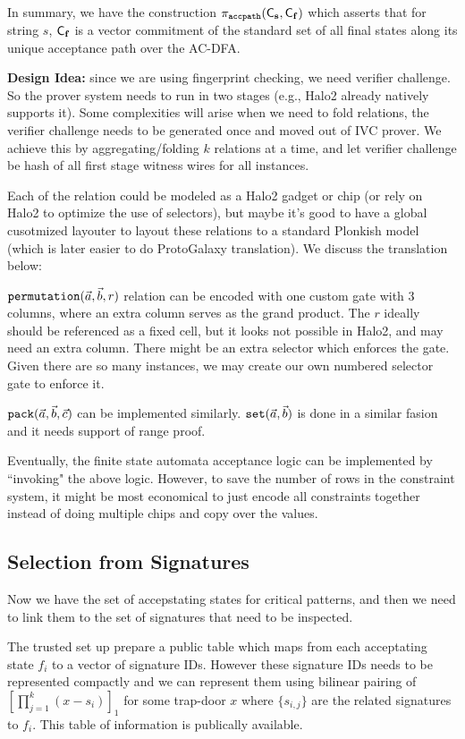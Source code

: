 In summary, we have the construction
$\pi_{\texttt{accpath}}({\mathsf{C}}_{{{\mathbf {s}}}}, {\mathsf{C}}_{{{\mathbf {f}}}})$ which
asserts that for string $s$, ${\mathsf{C}}_{{{\mathbf {f}}}}$
is a vector commitment of the standard set of all
final states along its unique acceptance path over the 
AC-DFA.

{\bf Design Idea:} since we are using fingerprint checking, we
need verifier challenge. So the prover system needs to run 
in two stages (e.g., Halo2 already natively supports it).
Some complexities will arise when we need to fold relations,
the verifier challenge needs to be generated once and moved out
of IVC prover. We achieve this by aggregating/folding $k$
relations at a time, and let verifier challenge be
hash of all first stage witness wires for all instances.

Each of the relation could be modeled as a Halo2 gadget or chip
(or rely on Halo2 to optimize the use of selectors), but 
maybe it's good to have a global cusotmized layouter to
layout these relations to a standard Plonkish model (which
is later easier to do ProtoGalaxy translation). We discuss the
translation below:

${\tt permutation}(\vec{a}, \vec{b}, r)$ relation can be encoded
with one custom gate with $3$ columns, where an extra column
serves as the grand product. The $r$ ideally should be referenced
as a fixed cell, but it looks not possible in Halo2, and may need
an extra column. There might be an extra selector which enforces
the gate. Given there are so many instances, we may create our
own numbered selector gate to enforce it.

${\tt pack}(\vec{a}, \vec{b}, \vec{c})$ can be implemented similarly.
${\tt set}(\vec{a},\vec{b})$ is done in a similar fasion and
it needs support of range proof.

Eventually, the finite state automata acceptance logic
can be implemented by ``invoking" the above logic. However,
to save the number of rows in the constraint system, it might
be most economical to just encode all constraints together
instead of doing multiple chips and copy over the values.

\subsection{Selection from Signatures}
Now we have the set of accepstating states for
critical patterns, and then we need to link them to
the set of signatures that need to be inspected.

The trusted set up prepare a public table which 
maps from each acceptating state
$f_i$ to a vector of signature IDs.
However these signature IDs needs to be
represented compactly and we can represent them
using bilinear pairing of $[\prod_{j=1}^k(x-s_i)]_1$
for some trap-door $x$ where $\{s_{i,j}\}$  are the
related signatures to $f_i$. This table of information
is publically available.

